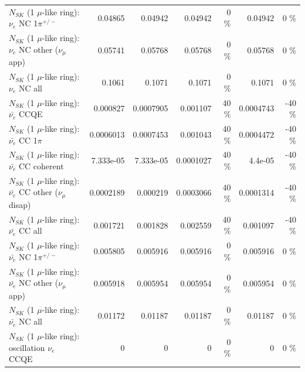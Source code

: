 \begin{table}
\begin{tabular}{| l | r | r | r  r | r  r |}
\hline
                           $N_{SK}$ (1 $\mu$-like ring): $\nu_e$ NC 1$\pi^{+/-}$ &         0.04865 &         0.04942 &         0.04942 &        0 \%  &         0.04942 &        0 \%  \\ 
                  $N_{SK}$ (1 $\mu$-like ring): $\nu_e$ NC other ($\nu_\mu$ app) &         0.05741 &         0.05768 &         0.05768 &        0 \%  &         0.05768 &        0 \%  \\ 
                                  $N_{SK}$ (1 $\mu$-like ring): $\nu_{e}$ NC all &          0.1061 &          0.1071 &          0.1071 &        0 \%  &          0.1071 &        0 \%  \\ 
\hline
\hline
\hline
                                $N_{SK}$ (1 $\mu$-like ring): $\bar{\nu_e}$ CCQE &        0.000827 &       0.0007905 &        0.001107 &       40 \%  &       0.0004743 &      -40 \%  \\ 
                           $N_{SK}$ (1 $\mu$-like ring): $\bar{\nu_e}$ CC 1$\pi$ &       0.0006013 &       0.0007453 &        0.001043 &       40 \%  &       0.0004472 &      -40 \%  \\ 
                         $N_{SK}$ (1 $\mu$-like ring): $\bar{\nu_e}$ CC coherent &       7.333e-05 &       7.333e-05 &       0.0001027 &       40 \%  &         4.4e-05 &      -40 \%  \\ 
          $N_{SK}$ (1 $\mu$-like ring): $\bar{\nu_e}$ CC other ($\nu_\mu$ disap) &       0.0002189 &        0.000219 &       0.0003066 &       40 \%  &       0.0001314 &      -40 \%  \\ 
                            $N_{SK}$ (1 $\mu$-like ring): $\bar{\nu_{e}}$ CC all &        0.001721 &        0.001828 &        0.002559 &       40 \%  &        0.001097 &      -40 \%  \\ 
\hline
                     $N_{SK}$ (1 $\mu$-like ring): $\bar{\nu_e}$ NC 1$\pi^{+/-}$ &        0.005805 &        0.005916 &        0.005916 &        0 \%  &        0.005916 &        0 \%  \\ 
            $N_{SK}$ (1 $\mu$-like ring): $\bar{\nu_e}$ NC other ($\nu_\mu$ app) &        0.005918 &        0.005954 &        0.005954 &        0 \%  &        0.005954 &        0 \%  \\ 
                            $N_{SK}$ (1 $\mu$-like ring): $\bar{\nu_{e}}$ NC all &         0.01172 &         0.01187 &         0.01187 &        0 \%  &         0.01187 &        0 \%  \\ 
\hline
\hline
\hline
                          $N_{SK}$ (1 $\mu$-like ring): oscillation $\nu_e$ CCQE &               0 &               0 &               0 &        0 \%  &               0 &        0 \%  \\ 

\end{tabular}
\end{table}
